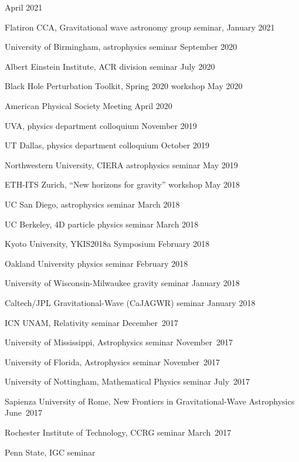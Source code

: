 \begin{etaremune}
  April 2021
\item
  Flatiron CCA, Gravitational wave astronomy group seminar,
  \hfill{}
  January 2021
\item
  University of Birmingham, astrophysics seminar
  \hfill{}
  September 2020
\item
  Albert Einstein Institute, ACR division seminar
  \hfill{}
  July 2020
\item
  Black Hole Perturbation Toolkit, Spring 2020 workshop
  \hfill{}
  May 2020
\item
  American Physical Society Meeting
  \hfill{}
  April 2020
\item
  UVA, physics department colloquium
  \hfill{}
  November 2019
\item
  UT Dallas, physics department colloquium
  \hfill{}
  October 2019
\item
  Northwestern University, CIERA astrophysics seminar
  \hfill{}
  May 2019
\item
  ETH-ITS Zurich, ``New horizons for gravity'' workshop
  \hfill{}
  May 2018
\item
  UC San Diego, astrophysics seminar
  \hfill{}
  March 2018
\item
  UC Berkeley, 4D particle physics seminar
  \hfill{}
  March 2018
\item
  Kyoto University, YKIS2018a Symposium
  \hfill{}
  February 2018
\item
  Oakland University physics seminar
  \hfill{}
  February 2018
\item
  University of Wisconsin-Milwaukee gravity seminar
  \hfill{}
  January 2018
\item
  Caltech/JPL Gravitational-Wave (CaJAGWR) seminar
  \hfill{}
  January 2018
\item
  ICN UNAM,
  Relativity seminar
  \hfill{}
  December~2017
\item
  University of Mississippi,
  Astrophysics seminar
  \hfill{}
  November~2017
\item
  University of Florida,
  Astrophysics seminar
  \hfill{}
  November~2017
\item
  University of Nottingham,
  Mathematical Physics seminar
  \hfill{}
  July~2017
\item
  Sapienza University of Rome,
  New Frontiers in Gravitational-Wave Astrophysics
  \hfill{}
  June~2017
\item
  Rochester Institute of Technology,
  CCRG seminar
  \hfill{}
  March~2017
\item
  Penn State,
  IGC seminar

\end{etaremune}
